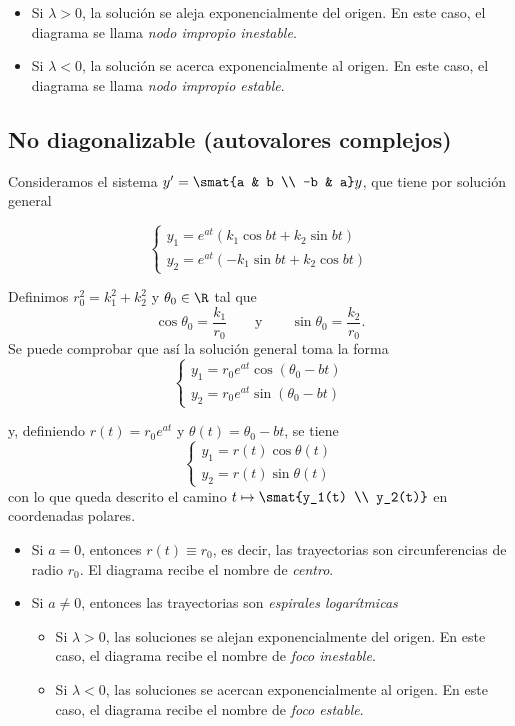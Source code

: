 \documentclass[../main.tex]{subfiles}
\begin{document}
\begin{itemize}
\item Si \(\lambda > 0\), la solución se aleja exponencialmente del origen. En
  este caso, el diagrama se llama \emph{nodo impropio inestable}.
\item Si \(\lambda < 0\), la solución se acerca exponencialmente al origen. En
  este caso, el diagrama se llama \emph{nodo impropio estable}.
\end{itemize}

\subsection{No diagonalizable (autovalores complejos)}
Consideramos el sistema \(y' = \smat{a & b \\ -b & a}y\), que tiene por solución
general

\[
  \begin{cases}
    y_1 = e^{at}(k_1 \cos bt + k_2 \sin bt) \\
    y_2 = e^{at}(-k_1 \sin bt + k_2 \cos bt)
  \end{cases}
\]

Definimos \(r_0^2 = k_1^2+k_2^2\) y \(\theta_0 \in \R\) tal que
\[\cos \theta_0 = \frac{k_1}{r_0} \qquad \text{y} \qquad \sin \theta_0 = \frac{k_2}{r_0}.\]
Se puede comprobar que así la solución general toma la forma
\[
  \begin{cases}
    y_1 = r_0e^{at} \cos (\theta_0 - bt) \\
    y_2 = r_0e^{at} \sin (\theta_0 - bt)
  \end{cases}
\]

y, definiendo \(r(t) = r_0e^{at}\) y \(\theta(t) = \theta_0 - bt\), se tiene
\[
  \begin{cases}
    y_1 = r(t) \cos \theta(t) \\
    y_2 = r(t) \sin \theta(t)
  \end{cases}
\]
con lo que queda descrito el camino \(t \mapsto \smat{y_1(t) \\ y_2(t)}\) en
coordenadas polares.

\begin{itemize}
\item Si \(a = 0\), entonces \(r(t) \equiv r_0\), es decir, las trayectorias son
  circunferencias de radio \(r_0\). El diagrama recibe el nombre de \emph{centro}.
\item Si \(a \neq 0\), entonces las trayectorias son \emph{espirales logarítmicas}
  \begin{itemize}
  \item Si \(\lambda > 0\), las soluciones se alejan exponencialmente del
    origen. En este caso, el diagrama recibe el nombre de \emph{foco inestable}.
  \item Si \(\lambda < 0\), las soluciones se acercan exponencialmente al
    origen. En este caso, el diagrama recibe el nombre de \emph{foco estable}.
  \end{itemize}
\end{itemize}
\end{document}
